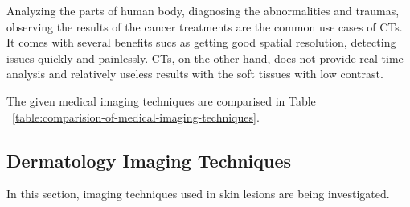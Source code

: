 \begin{itemize}
                    

                    Analyzing the parts of human body, diagnosing the abnormalities and traumas, observing the results of the cancer treatments are the common use cases of CTs.
                    It comes with several benefits sucs as getting good spatial resolution, detecting issues quickly and painlessly.
                    CTs, on the other hand, does not provide real time analysis and relatively useless results with the soft tissues with low contrast.

                

        \end{itemize}

        The given medical imaging techniques are comparised in Table ~\ref{table:comparision-of-medical-imaging-techniques}.

    \subsection{Dermatology Imaging Techniques}

        In this section, imaging techniques used in skin lesions are being investigated.

